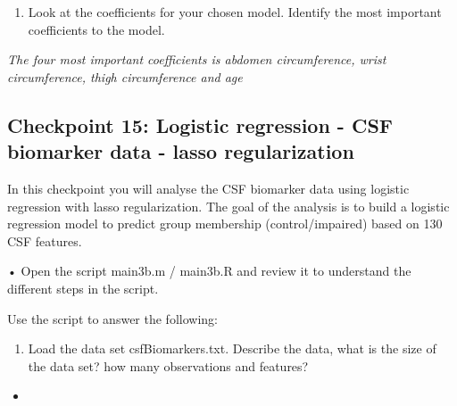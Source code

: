 \documentclass[
  letterpaper,
  DIV=11,
  numbers=noendperiod]{scrartcl}
\providecommand{\tightlist}{%
  \setlength{\itemsep}{0pt}\setlength{\parskip}{0pt}}\usepackage{longtable,booktabs,array}
\begin{document}
\begin{enumerate}
\def\labelenumi{(\alph{enumi})}
\setcounter{enumi}{10}
\tightlist
\item
  Look at the coefficients for your chosen model. Identify the most
  important coefficients to the model.
\end{enumerate}

\emph{The four most important coefficients is abdomen circumference,
wrist circumference, thigh circumference and age}

\hypertarget{checkpoint-15-logistic-regression---csf-biomarker-data---lasso-regularization}{%
\subsection{Checkpoint 15: Logistic regression - CSF biomarker data -
lasso
regularization}\label{checkpoint-15-logistic-regression---csf-biomarker-data---lasso-regularization}}

In this checkpoint you will analyse the CSF biomarker data using
logistic regression with lasso regularization. The goal of the analysis
is to build a logistic regression model to predict group membership
(control/impaired) based on 130 CSF features.

• Open the script main3b.m / main3b.R and review it to understand the
different steps in the script.

Use the script to answer the following:

\begin{enumerate}
\def\labelenumi{(\alph{enumi})}
\tightlist
\item
  Load the data set csfBiomarkers.txt. Describe the data, what is the
  size of the data set? how many observations and features?
\end{enumerate}

\begin{itemize}
\tightlist
\item
\end{itemize}
\end{document}
